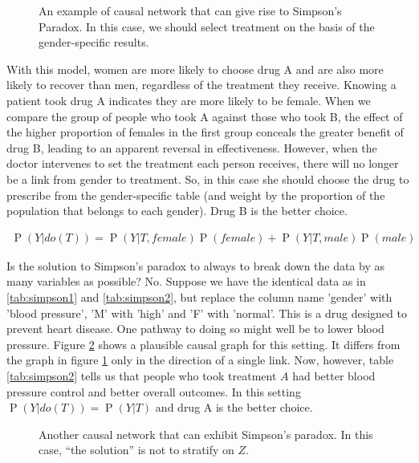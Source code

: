 \documentclass[11pt,a4paper,twoside]{report}
\newcommand{\eqn}[1]{\begin{align}#1\end{align}}
\renewcommand{\P}[1]{\operatorname{P}\left(#1\right)}
\newcommand{\quotes}[1]{``#1''}
\theoremstyle{plain}
\theoremstyle{definition}
\begin{document}
\begin{figure}[ht]
\centering
{}
\caption{An example of causal network that can give rise to Simpson's Paradox. In this case, we should select treatment on the basis of the gender-specific results.}
\label{fig:simpsons_paradox}
\end{figure}

With this model, women are more likely to choose drug A and are also more likely to recover than men, regardless of the treatment they receive. Knowing a patient took drug A indicates they are more likely to be female. When we compare the group of people who took A against those who took B, the effect of the higher proportion of females in the first group conceals the greater benefit of drug B, leading to an apparent reversal in effectiveness. However, when the doctor intervenes to set the treatment each person receives, there will no longer be a link from gender to treatment. So, in this case she should choose the drug to prescribe from the gender-specific table (and weight by the proportion of the population that belongs to each gender). Drug B is the better choice.

\eqn{
\P{Y|do(T)} = \P{Y|T,female}\P{female}+ \P{Y|T,male}\P{male}
}

Is the solution to Simpson's paradox to always to break down the data by as many variables as possible? No. Suppose we have the identical data as in \ref{tab:simpson1} and \ref{tab:simpson2}, but replace the column name 'gender' with 'blood pressure', 'M' with 'high' and 'F' with 'normal'. This is a drug designed to prevent heart disease. One pathway to doing so might well be to lower blood pressure. Figure \ref{fig:simpsons_paradox2} shows a plausible causal graph for this setting. It differs from the graph in figure \ref{fig:simpsons_paradox} only in the direction of a single link. Now, however, table \ref{tab:simpson2} tells us that people who took treatment $A$ had better blood pressure control and better overall outcomes. In this setting $\P{Y|do(T)} = \P{Y|T}$ and drug A is the better choice. 

\begin{figure}[ht]
\centering
{}
\caption{Another causal network that can exhibit Simpson's paradox. In this case, \quotes{the solution} is not to stratify on $Z$.}
\label{fig:simpsons_paradox2}
\end{figure}
\end{document}
